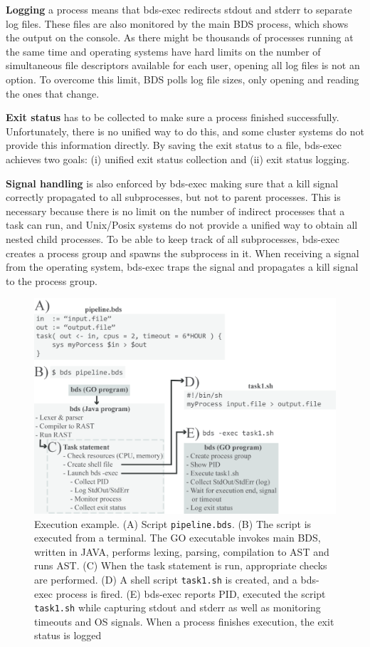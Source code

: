 \textbf{Logging} a process means that bds-exec redirects stdout and stderr to separate log files. These files are also monitored by the main BDS process, which shows the output on the console. As there might be thousands of processes running at the same time and operating systems have hard limits on the number of simultaneous file descriptors available for each user, opening all log files is not an option. To overcome this limit, BDS polls log file sizes, only opening and reading the ones that change.

\textbf{Exit status} has to be collected to make sure a process finished successfully. Unfortunately, there is no unified way to do this, and some cluster systems do not provide this information directly. By saving the exit status to a file, bds-exec achieves two goals: (i) unified exit status collection and (ii) exit status logging.

\textbf{Signal handling} is also enforced by bds-exec making sure that a kill signal correctly propagated to all subprocesses, but not to parent processes. This is necessary because there is no limit on the number of indirect processes that a task can run, and Unix/Posix systems do not provide a unified way to obtain all nested child processes. To be able to keep track of all subprocesses, bds-exec creates a process group and spawns the subprocess in it. When receiving a signal from the operating system, bds-exec traps the signal and propagates a kill signal to the process group.

\begin{figure}
    \centering
    \includegraphics[width=14cm]{bds_figure_1_small.png}
    \caption{Execution example. (A) Script \texttt{pipeline.bds}. (B) The script is executed from a terminal. The GO executable invokes main BDS, written in JAVA, performs lexing, parsing, compilation to AST and runs AST. (C) When the task statement is run, appropriate checks are performed. (D) A shell script \texttt{task1.sh} is created, and a bds-exec process is fired. (E) bds-exec reports PID, executed the script \texttt{task1.sh} while capturing stdout and stderr as well as monitoring timeouts and OS signals. When a process finishes execution, the exit status is logged}
    \label{fig:bdsexec}
\end{figure}

